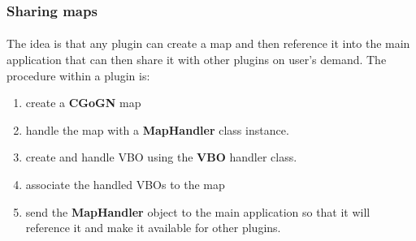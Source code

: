 \documentclass[a4paper]{scrreprt}
\begin{document}
	\subsubsection{Sharing maps}
	\paragraph{}
	The idea is that any plugin can create a map and then
	reference it into the main application that can then share it with other
	plugins on user's demand. The procedure within a plugin is:
	\begin{enumerate}
	  \item create a \textbf{CGoGN} map
	  \item handle the map with a \textbf{MapHandler} class instance.
	  \item create and handle VBO using the \textbf{VBO} handler class.
	  \item associate the handled VBOs to the map
	  \item send the \textbf{MapHandler} object to the main application so that it
	  will reference it and make it available for other plugins.
	\end{enumerate}
\end{document}
